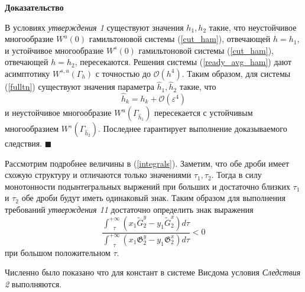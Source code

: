 \textbf{Доказательство}

В условиях \textit{утверждения 1} существуют значения $h_{1}, h_{2}$ такие, что неустойчивое многообразие $W^{u}(0)$ гамильтоновой системы (\ref{cut_ham}), отвечающей $h=h_{1}$, и устойчивое многообразие $W^{s}(0)$ гамильтоновой системы (\ref{cut_ham}), отвечающей $h=h_{2}$, пересекаются. Решения системы (\ref{ready_avg_ham}) дают асимптотику $W^{s,u}(\Gamma_h)$ с точностью до $\mathcal{O}(h^4)$. Таким образом, для системы (\ref{fulltn}) существуют значения параметра $\hat h_{1}, \hat h_{2}$ такие, что 
$$
\hat h_{k} = h_{k} + \mathcal{O}(\varepsilon^4)
$$
и неустойчивое многообразие $W^{u}(\Gamma_{\hat h_1})$ пересекается с устойчивым многообразием $W^{s}(\Gamma_{\hat h_2})$. Последнее гарантирует выполнение доказываемого следствия. $\blacksquare$

Рассмотрим подробнее величины в (\ref{integrals}). Заметим, что обе дроби имеет схожую структуру и отличаются только значениями $\tau_1, \tau_2$. Тогда в силу монотонности подынтегральных выржений при больших и достаточно близких $\tau_1$ и $\tau_2$ обе дроби будут иметь одинаковый знак. Таким образом для выполнения требований \textit{утверждения 11} достаточно определить знак выражения
\begin{equation*} 
\frac{\int_{\text{ } \tau}^{+\infty} \left( x_1 \tilde{G}_2^y - y_1 \tilde{G}_2^x \right) d \tau}{\int_{\text{ } \tau}^{+\infty} \left( x_1 \mathfrak{G}_2^y - y_1 \mathfrak{G}_2^x \right) d \tau}  < 0
\end{equation*}
при большом положительном $\tau$.

Численно было показано что для констант в системе Висдома \cite{wis1} условия \textit{Следствия 2} выполняются.
 